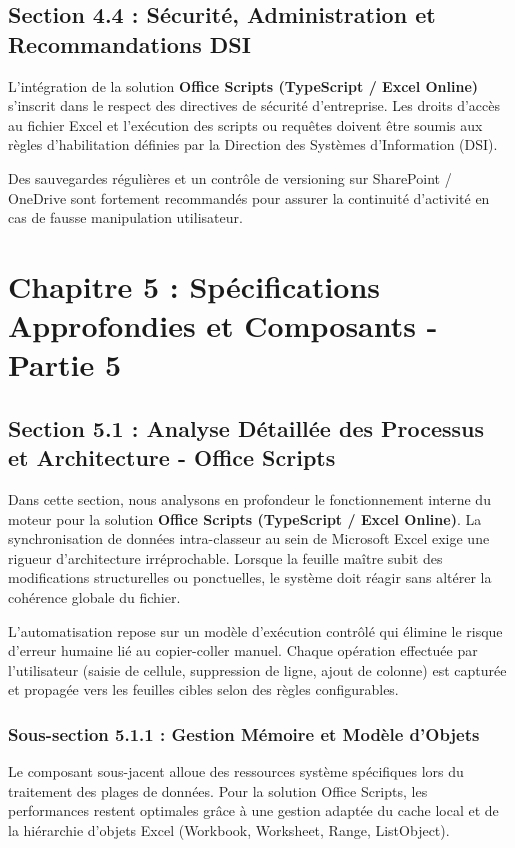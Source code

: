 \documentclass[12pt,a4paper]{report}
\begin{document}
\section{Section 4.4 : Sécurité, Administration et Recommandations DSI}
L'intégration de la solution \textbf{Office Scripts (TypeScript / Excel Online)} s'inscrit dans le respect des directives de sécurité d'entreprise. Les droits d'accès au fichier Excel et l'exécution des scripts ou requêtes doivent être soumis aux règles d'habilitation définies par la Direction des Systèmes d'Information (DSI).

Des sauvegardes régulières et un contrôle de versioning sur SharePoint / OneDrive sont fortement recommandés pour assurer la continuité d'activité en cas de fausse manipulation utilisateur.


\chapter{Chapitre 5 : Spécifications Approfondies et Composants - Partie 5}

\section{Section 5.1 : Analyse Détaillée des Processus et Architecture - Office Scripts}
Dans cette section, nous analysons en profondeur le fonctionnement interne du moteur pour la solution \textbf{Office Scripts (TypeScript / Excel Online)}. La synchronisation de données intra-classeur au sein de Microsoft Excel exige une rigueur d'architecture irréprochable. Lorsque la feuille maître subit des modifications structurelles ou ponctuelles, le système doit réagir sans altérer la cohérence globale du fichier.

L'automatisation repose sur un modèle d'exécution contrôlé qui élimine le risque d'erreur humaine lié au copier-coller manuel. Chaque opération effectuée par l'utilisateur (saisie de cellule, suppression de ligne, ajout de colonne) est capturée et propagée vers les feuilles cibles selon des règles configurables.


\subsection{Sous-section 5.1.1 : Gestion Mémoire et Modèle d'Objets}
Le composant sous-jacent alloue des ressources système spécifiques lors du traitement des plages de données. Pour la solution Office Scripts, les performances restent optimales grâce à une gestion adaptée du cache local et de la hiérarchie d'objets Excel (Workbook, Worksheet, Range, ListObject).
\end{document}
